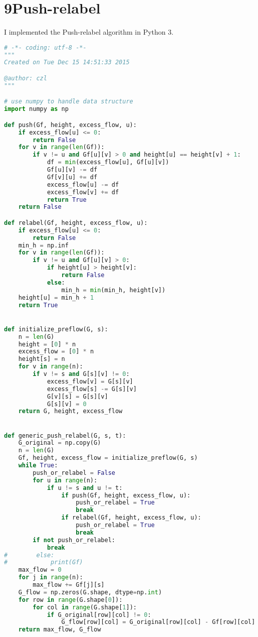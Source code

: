\documentclass[a4paper,12pt]{article}
\begin{document}
\section*{9\quad Push-relabel}

I implemented the Push-relabel algorithm in Python 3.

\begin{lstlisting}[language=python]
# -*- coding: utf-8 -*-
"""
Created on Tue Dec 15 14:51:33 2015

@author: czl
"""

# use numpy to handle data structure
import numpy as np

def push(Gf, height, excess_flow, u):
    if excess_flow[u] <= 0:
        return False
    for v in range(len(Gf)):
        if v != u and Gf[u][v] > 0 and height[u] == height[v] + 1:
            df = min(excess_flow[u], Gf[u][v])
            Gf[u][v] -= df
            Gf[v][u] += df
            excess_flow[u] -= df
            excess_flow[v] += df
            return True
    return False

def relabel(Gf, height, excess_flow, u):
    if excess_flow[u] <= 0:
        return False
    min_h = np.inf
    for v in range(len(Gf)):
        if v != u and Gf[u][v] > 0:
            if height[u] > height[v]:
                return False
            else:
                min_h = min(min_h, height[v])
    height[u] = min_h + 1
    return True


def initialize_preflow(G, s):
    n = len(G)
    height = [0] * n
    excess_flow = [0] * n
    height[s] = n
    for v in range(n):
        if v != s and G[s][v] != 0:
            excess_flow[v] = G[s][v]
            excess_flow[s] -= G[s][v]
            G[v][s] = G[s][v]
            G[s][v] = 0
    return G, height, excess_flow


def generic_push_relabel(G, s, t):
    G_original = np.copy(G)
    n = len(G)
    Gf, height, excess_flow = initialize_preflow(G, s)
    while True:
        push_or_relabel = False
        for u in range(n):
            if u != s and u != t:
                if push(Gf, height, excess_flow, u):
                    push_or_relabel = True
                    break
                if relabel(Gf, height, excess_flow, u):
                    push_or_relabel = True
                    break
        if not push_or_relabel:
            break
#        else:
#            print(Gf)
    max_flow = 0
    for j in range(n):
        max_flow += Gf[j][s]
    G_flow = np.zeros(G.shape, dtype=np.int)
    for row in range(G.shape[0]):
        for col in range(G.shape[1]):
            if G_original[row][col] != 0:
                G_flow[row][col] = G_original[row][col] - Gf[row][col]
    return max_flow, G_flow



\end{lstlisting}
\end{document}
